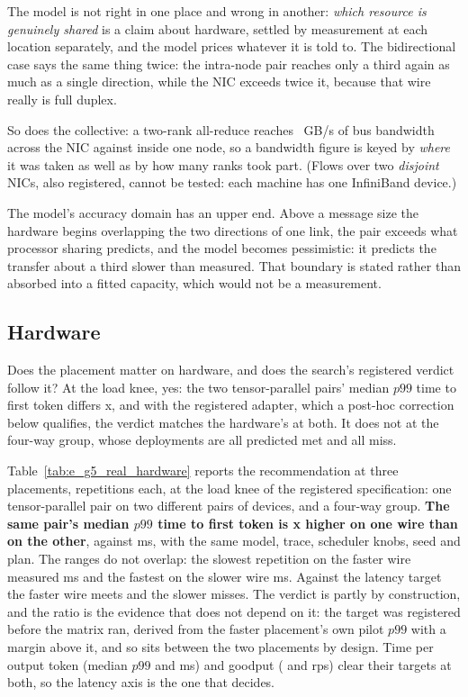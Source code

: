 The model is not right in one place and wrong in another: \emph{which resource
is genuinely shared} is a claim about hardware, settled by measurement at each
location separately, and the model prices whatever it is told to. The
bidirectional case says the same thing twice: the intra-node pair reaches only
a third again as much as a single direction, while the NIC exceeds twice it,
because that wire really is full duplex.

So does the collective: a two-rank all-reduce reaches \egfourCollNicTwo~GB/s
of bus bandwidth across the NIC against \egfourCollNodeTwo{} inside one node,
so a bandwidth figure is keyed by \emph{where} it was taken as well as by how
many ranks took part. (Flows over two \emph{disjoint} NICs, also registered,
cannot be tested: each machine has one InfiniBand device.)

The model's accuracy domain has an upper end. Above a message size the hardware
begins overlapping the two directions of one link, the pair exceeds what
processor sharing predicts, and the model becomes pessimistic: it predicts the
transfer about a third slower than measured.
That boundary is stated rather than absorbed into a fitted capacity, which
would not be a measurement.

\subsection{Hardware}
\label{sec:eval-hw}

Does the placement matter on hardware, and does the search's registered
verdict follow it? At the load knee, yes: the two tensor-parallel pairs'
median $p99$ time to first token differs \egfiveTtwoOverTone{}x, and with the
registered adapter, which a post-hoc correction below qualifies, the verdict
matches the hardware's at both. It does not at the
four-way group, whose \egfiveReps{} deployments are all predicted met and all
miss.



Table~\ref{tab:e_g5_real_hardware} reports the recommendation at three
placements, \egfiveReps{} repetitions each, at the load knee of the registered
specification: one tensor-parallel pair on two different pairs of devices, and
a four-way group. \textbf{The same pair's median $p99$ time to first token is
\egfiveTtwoOverTone{}x higher on one wire than on the other}, \egfiveTtwoMedian{}
against \egfiveToneMedian{} ms, with the same model, trace, scheduler knobs,
seed and plan. The ranges do not overlap: the slowest repetition on the
faster wire measured \egfiveToneRangeHi{} ms and the fastest on the slower wire
\egfiveTtwoRangeLo{} ms. Against the latency target the faster wire meets and
the slower misses. The verdict is partly by construction, and the ratio is the
evidence that does not depend on it: the target was registered before the
matrix ran, derived from the faster placement's own pilot $p99$ with a margin
above it, and so sits between the two placements by design. Time per output
token (median $p99$ \egfiveToneTpot{} and \egfiveTtwoTpot{} ms) and goodput
(\egfiveToneGoodput{} and \egfiveTtwoGoodput{} rps) clear their targets at
both, so the latency axis is the one that decides.

